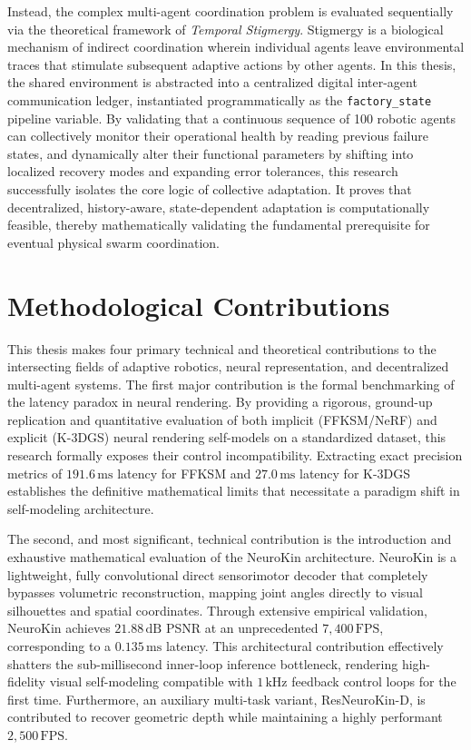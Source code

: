 \documentclass[12pt,a4paper,oneside]{report}
\begin{document}
Instead, the complex multi-agent coordination problem is evaluated sequentially via the theoretical framework of \textit{Temporal Stigmergy}. Stigmergy is a biological mechanism of indirect coordination wherein individual agents leave environmental traces that stimulate subsequent adaptive actions by other agents. In this thesis, the shared environment is abstracted into a centralized digital inter-agent communication ledger, instantiated programmatically as the \texttt{factory\_state} pipeline variable. By validating that a continuous sequence of 100 robotic agents can collectively monitor their operational health by reading previous failure states, and dynamically alter their functional parameters by shifting into localized recovery modes and expanding error tolerances, this research successfully isolates the core logic of collective adaptation. It proves that decentralized, history-aware, state-dependent adaptation is computationally feasible, thereby mathematically validating the fundamental prerequisite for eventual physical swarm coordination.

\section{Methodological Contributions}

This thesis makes four primary technical and theoretical contributions to the intersecting fields of adaptive robotics, neural representation, and decentralized multi-agent systems. The first major contribution is the formal benchmarking of the latency paradox in neural rendering. By providing a rigorous, ground-up replication and quantitative evaluation of both implicit (FFKSM/NeRF) and explicit (K-3DGS) neural rendering self-models on a standardized dataset, this research formally exposes their control incompatibility. Extracting exact precision metrics of $191.6\,\mathrm{ms}$ latency for FFKSM and $27.0\,\mathrm{ms}$ latency for K-3DGS establishes the definitive mathematical limits that necessitate a paradigm shift in self-modeling architecture.

The second, and most significant, technical contribution is the introduction and exhaustive mathematical evaluation of the NeuroKin architecture. NeuroKin is a lightweight, fully convolutional direct sensorimotor decoder that completely bypasses volumetric reconstruction, mapping joint angles directly to visual silhouettes and spatial coordinates. Through extensive empirical validation, NeuroKin achieves $21.88\,\mathrm{dB}$ PSNR at an unprecedented $7{,}400\,\mathrm{FPS}$, corresponding to a $0.135\,\mathrm{ms}$ latency. This architectural contribution effectively shatters the sub-millisecond inner-loop inference bottleneck, rendering high-fidelity visual self-modeling compatible with $1\,\mathrm{kHz}$ feedback control loops for the first time. Furthermore, an auxiliary multi-task variant, ResNeuroKin-D, is contributed to recover geometric depth while maintaining a highly performant $2{,}500\,\mathrm{FPS}$.
\end{document}
